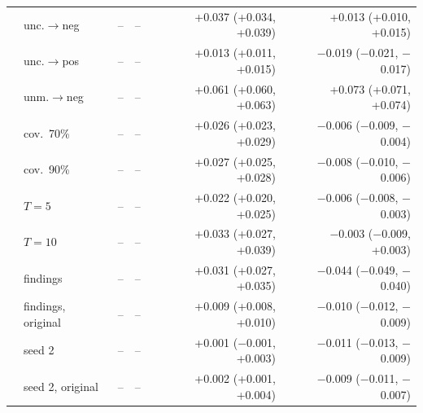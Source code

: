 \begin{longtable}{llrrrr}
 & unc.$\to$neg & -- & -- & +0.037 (+0.034, +0.039) & +0.013 (+0.010, +0.015)\\
 & unc.$\to$pos & -- & -- & +0.013 (+0.011, +0.015) & $-$0.019 ($-$0.021, $-$0.017)\\
 & unm.$\to$neg & -- & -- & +0.061 (+0.060, +0.063) & +0.073 (+0.071, +0.074)\\
 & cov.\ 70\% & -- & -- & +0.026 (+0.023, +0.029) & $-$0.006 ($-$0.009, $-$0.004)\\
 & cov.\ 90\% & -- & -- & +0.027 (+0.025, +0.028) & $-$0.008 ($-$0.010, $-$0.006)\\
 & $T=5$ & -- & -- & +0.022 (+0.020, +0.025) & $-$0.006 ($-$0.008, $-$0.003)\\
 & $T=10$ & -- & -- & +0.033 (+0.027, +0.039) & $-$0.003 ($-$0.009, +0.003)\\
 & findings & -- & -- & +0.031 (+0.027, +0.035) & $-$0.044 ($-$0.049, $-$0.040)\\
 & findings, original & -- & -- & +0.009 (+0.008, +0.010) & $-$0.010 ($-$0.012, $-$0.009)\\
 & seed 2 & -- & -- & +0.001 ($-$0.001, +0.003) & $-$0.011 ($-$0.013, $-$0.009)\\
 & seed 2, original & -- & -- & +0.002 (+0.001, +0.004) & $-$0.009 ($-$0.011, $-$0.007)\\
\bottomrule
\end{longtable}
